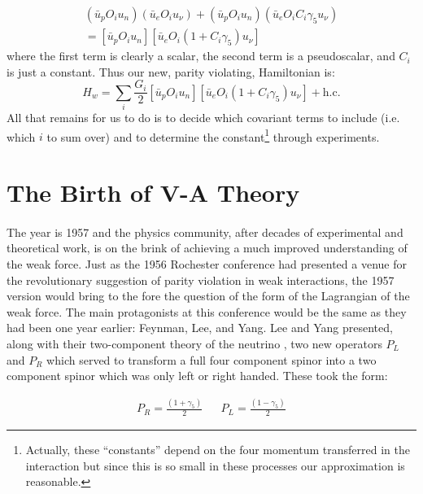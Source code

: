 \documentclass[a4paper,12pt]{book}
\begin{document}
\begin{align}
\left(\bar{u}_{p}O_{i}u_{n}\right)\left(\bar{u}_{e}O_{i}u_{\nu}\right)+\left(\bar{u}_{p}O_{i}u_{n}\right)\left(\bar{u}_{e}O_{i}C_{i}\gamma_{5}u_{\nu}\right) \\
=\left[\bar{u}_{p}O_{i}u_{n}\right]\left[\bar{u}_{e}O_{i}\left(1+C_{i}\gamma_{5}\right)u_{\nu}\right]
\end{align}
where the first term is clearly a scalar, the second term is a pseudoscalar, and $C_{i}$ is just a constant. Thus our new, parity violating, Hamiltonian is: 
\begin{equation}\label{general:Hamilton}
 H_{w}=\displaystyle\sum_{i}\frac{G_{i}}{2}\left[\bar{u}_{p}O_{i}u_{n}\right]\left[\bar{u}_{e}O_{i}\left(1+C_{i}\gamma_{5}\right)u_{\nu}\right]+\text{h.c.}
\end{equation}
All that remains for us to do is to decide which covariant terms to include (i.e. which $i$ to sum over) and to determine the constant\footnote{Actually, these ``constants'' depend on the four momentum transferred in the interaction but since this is so small in these processes our approximation is reasonable.} through experiments. 

\section{The Birth of V-A Theory}

\paragraph{}The year is 1957 and the physics community, after decades of experimental and theoretical work, is on the brink of achieving a much improved understanding of the weak force. Just as the 1956 Rochester conference had presented a venue for the revolutionary suggestion of parity violation in weak interactions, the 1957 version would bring to the fore the question of the form of the Lagrangian of the weak force. The main protagonists at this conference would be the same as they had been one year earlier: Feynman, Lee, and Yang. Lee and Yang presented, along with their two-component theory of the neutrino \cite{lee:neutrinos}, two new operators $P_{L}$ and $P_{R}$ which served to transform a full four component spinor into a two component spinor which was only left or right handed. These took the form:

\begin{align}
 P_{R}=\frac{\left(1+\gamma_{5}\right)}{2} && P_{L}=\frac{\left(1-\gamma_{5}\right)}{2}
\end{align}
\end{document}
